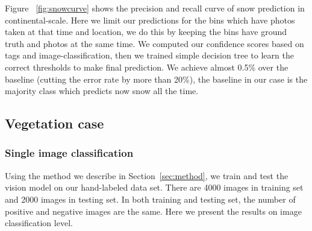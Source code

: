 %
%
%
Figure ~\ref{fig:snowcurve} shows the precision and recall curve of snow prediction in continental-scale.
Here we limit our predictions for the bins which have photos taken at that time and location, we do this by keeping the bins have ground truth and photos at the same time. 
We computed our confidence scores based on tags and image-classification, then we trained simple decision tree to learn the correct thresholds to make final prediction. We achieve almost 0.5\% over the baseline (cutting the error rate by more than 20\%), the baseline in our case is the majority class which predicts now snow all the time.  
  





\subsection{Vegetation case}

\subsubsection{Single image classification}


Using the method we describe in Section~\ref{sec:method}, we train and test the vision model on our hand-labeled data set.
There are 4000 images in training set and 2000 images in testing set. In both training and testing set, the number of positive and negative images are the same. Here we present the results on image classification level.

%
%

